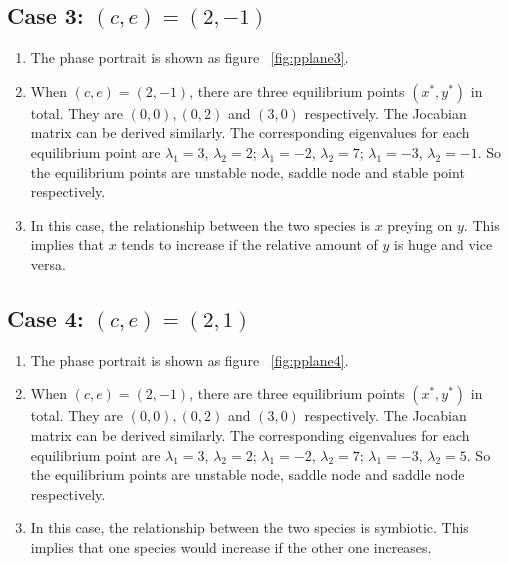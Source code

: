 \subsection*{Case 3: $(c,e)=(2,-1)$}
\begin{enumerate}
\item The phase portrait is shown as figure ~\ref{fig:pplane3}.
\item When $(c,e)=(2,-1)$, there are three equilibrium points $(x^*,y^*)$ in total. They are $(0,0),(0,2)$ and $(3,0)$ respectively. The Jocabian matrix can be derived similarly. The corresponding eigenvalues for each equilibrium point are $\lambda_{1} = 3$, $\lambda_{2} = 2$; $\lambda_1 = -2$, $\lambda_2 = 7$; $\lambda_1 = -3$, $\lambda_2 = -1$. So the equilibrium points are unstable node, saddle node and stable point respectively. 
\item In this case, the relationship between the two species is $x$ preying on $y$. This implies that $x$ tends to increase if the relative amount of $y$ is huge and vice versa.   
\end{enumerate}

\subsection*{Case 4: $(c,e)=(2,1)$}
\begin{enumerate}
\item The phase portrait is shown as figure ~\ref{fig:pplane4}. 
\item When $(c,e)=(2,-1)$, there are three equilibrium points $(x^*,y^*)$ in total. They are $(0,0),(0,2)$ and $(3,0)$ respectively. The Jocabian matrix can be derived similarly. The corresponding eigenvalues for each equilibrium point are $\lambda_{1} = 3$, $\lambda_{2} = 2$; $\lambda_1 = -2$, $\lambda_2 = 7$; $\lambda_1 = -3$, $\lambda_2 = 5$. So the equilibrium points are unstable node, saddle node and saddle node respectively. 
\item In this case, the relationship between the two species is symbiotic. This implies that one species would increase if the other one increases. 
\end{enumerate}